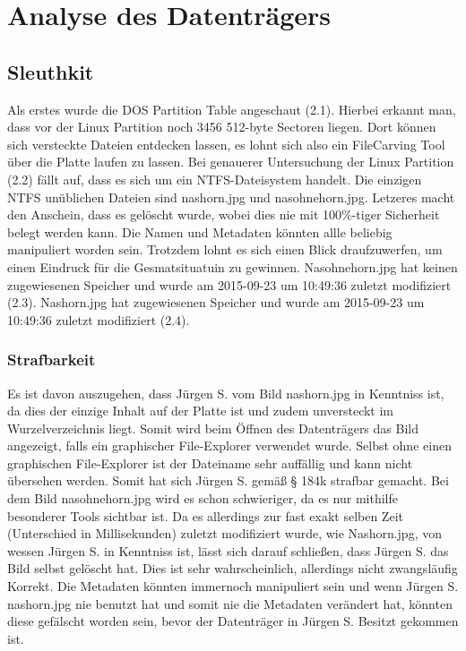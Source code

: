 \chapter{Analyse des Datenträgers} 

\section{Sleuthkit}

Als erstes wurde die DOS Partition Table angeschaut (2.1). Hierbei erkannt man, dass vor der Linux Partition noch 3456 512-byte Sectoren liegen. Dort können sich versteckte Dateien entdecken lassen, es lohnt sich also ein FileCarving Tool über die Platte laufen zu lassen. Bei genauerer Untersuchung der Linux Partition (2.2) fällt auf, dass es sich um ein NTFS-Dateisystem handelt. Die einzigen NTFS unüblichen Dateien sind nashorn.jpg und nasohnehorn.jpg. Letzeres macht den Anschein, dass es gelöscht wurde, wobei dies nie mit 100\%-tiger Sicherheit belegt werden kann. Die Namen und Metadaten könnten allle beliebig manipuliert worden sein. Trotzdem lohnt es sich einen Blick draufzuwerfen, um einen Eindruck für die Gesmatsituatuin zu gewinnen. Nasohnehorn.jpg hat keinen zugewiesenen Speicher und wurde am 2015-09-23 um 10:49:36 zuletzt modifiziert (2.3).  Nashorn.jpg hat zugewiesenen Speicher und wurde am 2015-09-23 um 10:49:36 zuletzt modifiziert (2.4).
 
\subsection{Strafbarkeit}
Es ist davon auszugehen, dass Jürgen S. vom Bild nashorn.jpg in Kenntniss ist, da dies der einzige Inhalt auf der Platte ist und zudem unversteckt im Wurzelverzeichnis liegt. Somit wird beim Öffnen des Datenträgers das Bild angezeigt, falls ein graphischer File-Explorer verwendet wurde. Selbst ohne einen graphischen File-Explorer ist der Dateiname sehr auffällig und kann nicht übersehen werden. Somit hat sich Jürgen S. gemäß § 184k strafbar gemacht. Bei dem Bild nasohnehorn.jpg wird es schon schwieriger, da es nur mithilfe besonderer Tools sichtbar ist. Da es allerdings zur fast exakt selben Zeit (Unterschied in Millisekunden) zuletzt modifiziert wurde, wie Nashorn.jpg, von wessen Jürgen S. in Kenntniss ist, lässt sich darauf schließen, dass Jürgen S. das Bild selbst gelöscht hat. Dies ist sehr wahrscheinlich, allerdings nicht zwangsläufig Korrekt. Die Metadaten könnten immernoch manipuliert sein und wenn Jürgen S. nashorn.jpg nie benutzt hat und somit nie die Metadaten verändert hat, könnten diese gefälscht worden sein, bevor der Datenträger in Jürgen S. Besitzt gekommen ist.

